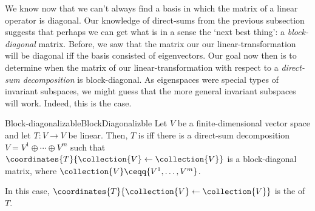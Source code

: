 We know now that we can't always find a basis in which the matrix of a linear operator is diagonal.  Our knowledge of direct-sums from the previous subsection suggests that perhaps we can get what is in a sense the `next best thing':  a \emph{block-diagonal} matrix.  Before, we saw that the matrix our our linear-transformation will be diagonal iff the basis consisted of eigenvectors.  Our goal now then is to determine when the matrix of our linear-transformation with respect to a \emph{direct-sum decomposition} is block-diagonal.  As eigenspaces were special types of invariant subspaces, we might guess that the more general invariant subspaces will work.  Indeed, this is the case.
\begin{dfn}{Block-diagonalizable}{BlockDiagonalizble}
	Let $V$ be a finite-dimensional vector space and let $T\colon V\rightarrow V$ be linear.  Then, $T$ is  iff there is a direct-sum decomposition $V=V^1\oplus \cdots \oplus V^m$ such that $\coordinates{T}{\collection{V}\leftarrow \collection{V}}$ is a block-diagonal matrix, where $\collection{V}\ceqq \{ V^1,\ldots ,V^m\}$.
	\begin{rmk}
		In this case, $\coordinates{T}{\collection{V}\leftarrow \collection{V}}$ is the  of $T$.
	\end{rmk}
\end{dfn}
